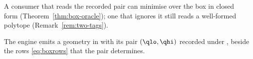 
A consumer that reads the recorded pair can minimise over the box in closed
form (Theorem~\ref{thm:box-oracle}); one that ignores it still reads a well-formed
polytope (Remark~\ref{rem:two-tags}).

\begin{requirement}\label{req:box-bounds-key}
The engine emits a geometry in  with its pair
$(\qlo,\qhi)$ recorded under , beside the rows
\eqref{eq:boxrows} that the pair determines.
\end{requirement}
